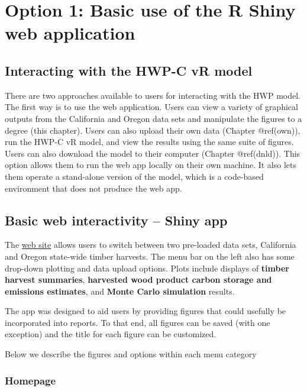 \documentclass[
  openany]{book}
\begin{document}
\hypertarget{app}{%
\chapter{Option 1: Basic use of the R Shiny web application}\label{app}}

\hypertarget{app-sum}{%
\section{Interacting with the HWP-C vR model}\label{app-sum}}

There are two approaches available to users for interacting with the HWP
model. The first way is to use the web application. Users can view a
variety of graphical outputs from the California and Oregon data sets
and manipulate the figures to a degree (this chapter). Users can also
upload their own data (Chapter @ref(own)), run the HWP-C vR model, and
view the results using the same suite of figures. Users can also
download the model to their computer (Chapter @ref(dnld)). This option
allows them to run the web app locally on their own machine. It also
lets them operate a stand-alone version of the model, which is a
code-based environment that does not produce the web app.

\hypertarget{app-shiny}{%
\section{Basic web interactivity -- Shiny app}\label{app-shiny}}

The \href{https://groomanalyticsllc.shinyapps.io/HWP-C-vR/}{web site}
allows users to switch between two pre-loaded data sets, California and
Oregon state-wide timber harvests. The menu bar on the left also has
some drop-down plotting and data upload options. Plots include displays
of \textbf{timber harvest summaries}, \textbf{harvested wood product
carbon storage and emissions estimates}, and \textbf{Monte Carlo
simulation} results.

The app was designed to aid users by providing figures that could
usefully be incorporated into reports. To that end, all figures can be
saved (with one exception) and the title for each figure can be
customized.

Below we describe the figures and options within each menu category

\hypertarget{app-shiny-home}{%
\subsection{Homepage}\label{app-shiny-home}}
\end{document}
